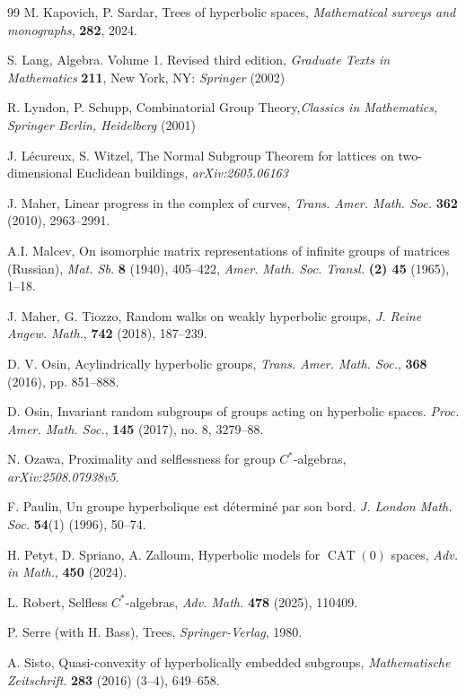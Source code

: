 \documentclass[11pt,letterpaper]{article}
\DeclareMathOperator{\CAT}{CAT}
\theoremstyle{definition}
\theoremstyle{remark}
\begin{document}
\begin{thebibliography}{99}
M. Kapovich, P. Sardar, Trees of hyperbolic spaces, \emph{Mathematical surveys and monographs}, {\bf 282}, 2024.

S. Lang, Algebra. Volume 1. Revised third edition, \emph{Graduate Texts in Mathematics} {\bf 211}, New York, NY: \emph{Springer} (2002)

R. Lyndon, P. Schupp, Combinatorial Group Theory,\emph{Classics in Mathematics, Springer Berlin, Heidelberg} (2001)

J. Lécureux, S. Witzel, The Normal Subgroup Theorem for lattices on two-dimensional Euclidean buildings, \emph{arXiv:2605.06163}

J. Maher, Linear progress in the complex of curves, \emph{Trans. Amer. Math. Soc.} \textbf{362} (2010),  2963--2991.

A.I. Malcev, On isomorphic matrix representations of infinite groups of matrices (Russian), \emph{Mat. Sb.} {\bf 8} (1940), 405–422, \emph {Amer. Math. Soc. Transl.} {\bf (2) 45} (1965), 1--18.

J. Maher, G. Tiozzo, Random walks on weakly hyperbolic groups, \emph{J. Reine Angew. Math.}, \textbf {742} (2018), 187--239.

D. V. Osin, Acylindrically hyperbolic groups, \emph{Trans. Amer. Math. Soc.}, \textbf{368} (2016), pp. 851--888.

D. Osin, Invariant random subgroups of groups acting on hyperbolic spaces. \emph{Proc. Amer. Math. Soc.}, \textbf{145} (2017), no. 8, 3279--88.

N. Ozawa, Proximality and selflessness for group $C^*$-algebras,  \emph{arXiv:2508.07938v5}.

F. Paulin, Un groupe hyperbolique est déterminé par son bord. \emph{J. London Math. Soc.} \textbf{54}(1) (1996), 50--74.

H. Petyt, D. Spriano, A. Zalloum, Hyperbolic models for $\CAT(0)$ spaces, \emph{Adv. in Math.}, \textbf{450} (2024).

L. Robert, Selfless $C^*$-algebras, \emph{Adv. Math.} \textbf{478} (2025), 110409.

P. Serre (with H. Bass), Trees, \emph{Springer-Verlag}, 1980.

A. Sisto, Quasi-convexity of hyperbolically embedded subgroups, \emph{Mathematische Zeitschrift}. \textbf{283} (2016) (3–4), 649--658.


\end{thebibliography}
\end{document}
